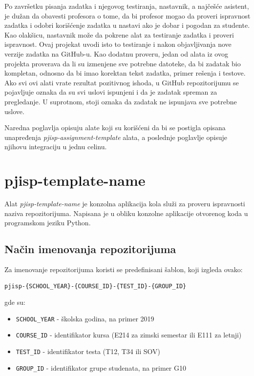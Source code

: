 \documentclass[12pt]{report}
\begin{document}
Po završetku pisanja zadatka i njegovog testiranja, nastavnik, a najčešće asistent, je dužan da obavesti profesora o tome, da bi profesor mogao da proveri ispravnost zadatka i odobri korišćenje zadatka u nastavi ako je dobar i pogodan za studente. Kao olakšicu, nastavnik može da pokrene alat za testiranje zadatka i proveri ispravnost. Ovaj projekat uvodi isto to testiranje i nakon objavljivanja nove verzije zadatka na GitHub-u. Kao dodatnu proveru, jedan od alata iz ovog projekta proverava da li su izmenjene sve potrebne datoteke, da bi zadatak bio kompletan, odnosno da bi imao korektan tekst zadatka, primer rešenja i testove. Ako svi ovi alati vrate rezultat pozitivnog ishoda, u GitHub repozitorijumu se pojavljuje oznaka da su svi uslovi ispunjeni i da je zadatak spreman za pregledanje. U suprotnom, stoji oznaka da zadatak ne ispunjava sve potrebne uslove.

Naredna poglavlja opisuju alate koji su korišćeni da bi se postigla opisana unapređenja \textit{pjisp-assignment-template} alata, a poslednje poglavlje opisuje njihovu integraciju u jednu celinu.

\section{pjisp-template-name}
Alat \textit{pjisp-template-name} \cite{pjisp-template-name} je konzolna aplikacija kola služi za proveru ispravnosti naziva repozitorijuma. Napisana je u obliku konzolne aplikacije otvorenog koda u programskom jeziku Python.

\subsection{Način imenovanja repozitorijuma}
Za imenovanje repozitorijuma koristi se predefinisani šablon, koji izgleda ovako:

\begin{verbatim}
pjisp-{SCHOOL_YEAR}-{COURSE_ID}-{TEST_ID}-{GROUP_ID}
\end{verbatim}

gde su:

\begin{itemize}
    \item \texttt{{SCHOOL\_YEAR}} - školska godina, na primer 2019
    \item \texttt{{COURSE\_ID}} - identifikator kursa (E214 za zimski semestar ili E111 za letnji)
    \item \texttt{{TEST\_ID}} - identifikator testa (T12, T34 ili SOV)
    \item \texttt{{GROUP\_ID}} - identifikator grupe studenata, na primer G10
\end{itemize}
\end{document}
